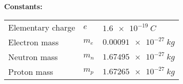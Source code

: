 \documentclass[../TST.tex]{subfiles}
\begin{document}
\ifprob 
\vspace*{2ex}
\textbf{Constants:}\\[5pt]
\begin{tabular}{@{}lll@{}}
Elementary charge & $e$  & $\qty{1.6e-19}{C}$  \\
Electron mass & $m_e$  & $\qty{0.00091e-27}{kg}$  \\
Neutron mass & $m_n$  & $\qty{1.67495e-27}{kg}$  \\
Proton mass & $m_p$  & $\qty{1.67265e-27}{kg}$  \\
\end{tabular}

\else
\fi
\end{document}
